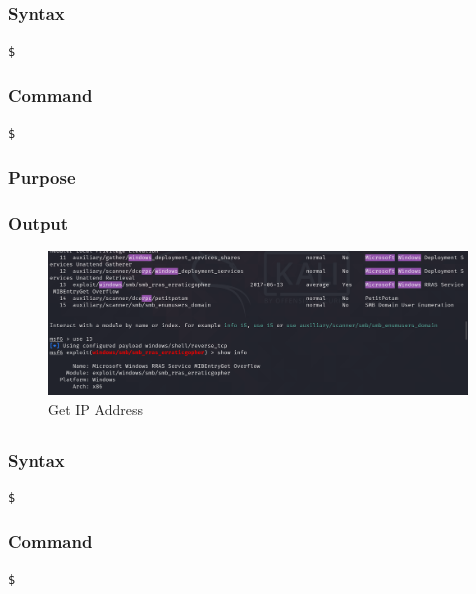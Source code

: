 \documentclass[11pt]{article}
\begin{document}
\subsection{}

\subsubsection*{Syntax}
\begin{verbatim}
$
\end{verbatim}

\subsubsection*{Command}
\begin{verbatim}
$
\end{verbatim}

\subsubsection*{Purpose}

\subsubsection*{Output}
\begin{figure}[H]
    \centering
    \includegraphics[width=0.99\textwidth]{a3_ss (20).png}
    \caption{Get IP Address}
    \label{fig:1}
\end{figure}
\subsection{}

\subsubsection*{Syntax}
\begin{verbatim}
$
\end{verbatim}

\subsubsection*{Command}
\begin{verbatim}
$
\end{verbatim}
\end{document}
